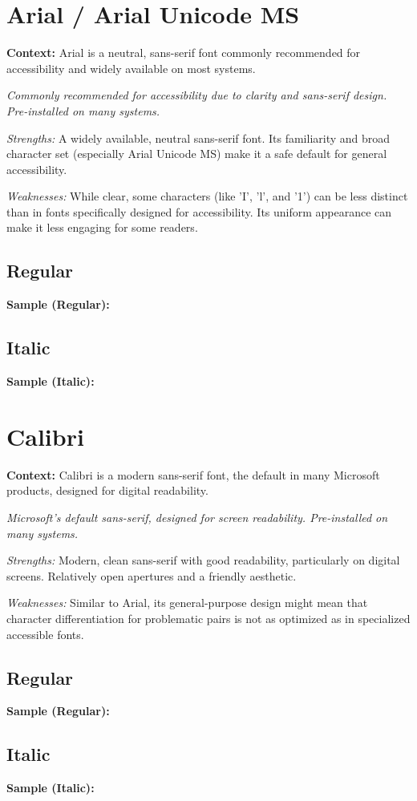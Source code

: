 \pagebreak
\section{Arial / Arial Unicode MS}\label{sec:arial}
\noindent
\textbf{Context:} Arial is a neutral, sans-serif font commonly recommended for accessibility and widely available on most systems.

\emph{Commonly recommended for accessibility due to clarity and sans-serif design. Pre-installed on many systems.}
\begin{raggedright}
\emph{Strengths:} A widely available, neutral sans-serif font. Its familiarity and broad character set (especially Arial Unicode MS) make it a safe default for general accessibility.

\emph{Weaknesses:} While clear, some characters (like 'I', 'l', and '1') can be less distinct than in fonts specifically designed for accessibility. Its uniform appearance can make it less engaging for some readers.

\subsection{Regular}
\noindent\textbf{Sample (Regular):}
\FontSample{\arialfont}

\subsection{Italic}
\noindent\textbf{Sample (Italic):}
\FontSample{{\arialfont\itshape}}
\end{raggedright}


\pagebreak
\section{Calibri}\label{sec:calibri}
\noindent
\textbf{Context:} Calibri is a modern sans-serif font, the default in many Microsoft products, designed for digital readability.

\emph{Microsoft’s default sans-serif, designed for screen readability. Pre-installed on many systems.}
\begin{raggedright}
\emph{Strengths:} Modern, clean sans-serif with good readability, particularly on digital screens. Relatively open apertures and a friendly aesthetic.

\emph{Weaknesses:} Similar to Arial, its general-purpose design might mean that character differentiation for problematic pairs is not as optimized as in specialized accessible fonts.

\subsection{Regular}
\noindent\textbf{Sample (Regular):}
\FontSample{\calibrifont}

\subsection{Italic}
\noindent\textbf{Sample (Italic):}
\FontSample{{\calibrifont\itshape}}
\end{raggedright}



